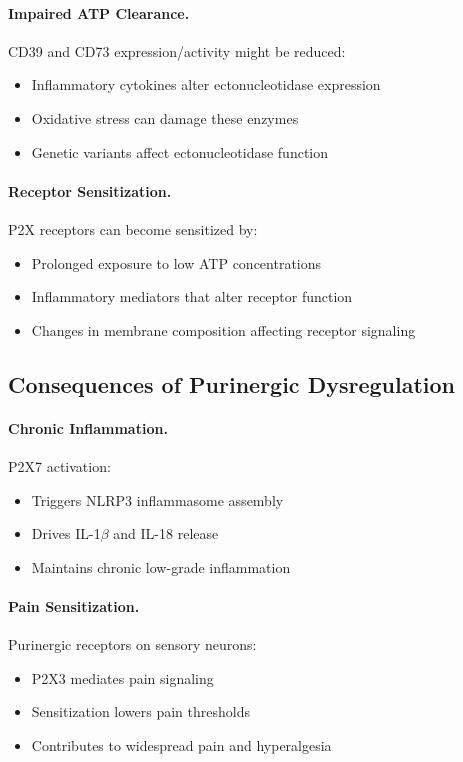 \paragraph{Impaired ATP Clearance.} CD39 and CD73 expression/activity might be reduced:
\begin{itemize}
    \item Inflammatory cytokines alter ectonucleotidase expression
    \item Oxidative stress can damage these enzymes
    \item Genetic variants affect ectonucleotidase function
\end{itemize}

\paragraph{Receptor Sensitization.} P2X receptors can become sensitized by:
\begin{itemize}
    \item Prolonged exposure to low ATP concentrations
    \item Inflammatory mediators that alter receptor function
    \item Changes in membrane composition affecting receptor signaling
\end{itemize}

\subsection{Consequences of Purinergic Dysregulation}

\paragraph{Chronic Inflammation.} P2X7 activation:
\begin{itemize}
    \item Triggers NLRP3 inflammasome assembly
    \item Drives IL-1$\beta$ and IL-18 release
    \item Maintains chronic low-grade inflammation
\end{itemize}

\paragraph{Pain Sensitization.} Purinergic receptors on sensory neurons:
\begin{itemize}
    \item P2X3 mediates pain signaling
    \item Sensitization lowers pain thresholds
    \item Contributes to widespread pain and hyperalgesia
\end{itemize}


